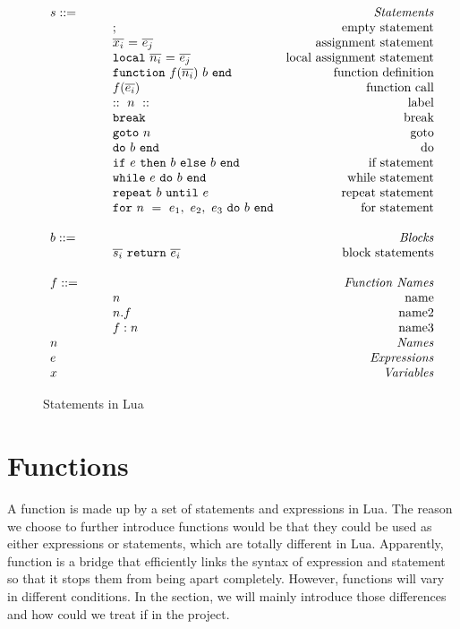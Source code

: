 \newcommand{\assign}[2]{{\overline{#1_i}}~{=}~{\overline{#2_j}}}
\newcommand{\doe}[1]{\mbox{\tt do}~#1~{\tt end}}
\newcommand{\ife}[3]{\mbox{\tt if}~{#1}~\mbox{\tt then}~{#2}~\mbox{\tt else}~{#3}~{\tt end}}
\newcommand{\whilee}[2]{\mbox{\tt while}~#1~{\tt do}~#2~{\tt end}}
\newcommand{\repeate}[2]{\mbox{\tt repeat}~#2~{\tt until}~#1~}
\newcommand{\for}[3]{\mbox{\tt for}~#1~=~#2_1,~#2_2,~#2_3~{\tt do}~#3~{\tt end}}
\newcommand{\function}[3]{\mbox{\tt function}~#1({\overline{#2_i}})~#3~{\tt end}}
\newcommand{\local}[2]{\mbox{\tt local}~{\assign #1 #2}}

\begin{figure}
\caption{Statements in Lua}
\label{fig:LuaStat}
\[
\begin{array}{llr}
  \mydefhead{s ::=\qquad\qquad\qquad\qquad}{Statements}
  \mydefcase{;}{empty statement}
  \mydefcase{\assign x e}{assignment statement}
  \mydefcase{\local n e}{local assignment statement}
  \mydefcase{\function f n b}{function definition}
  \mydefcase{f(\overline{e_i})}{function call}
  \mydefcase{::~n~::}{label}
  \mydefcase{\tt break}{break}
  \mydefcase{{\tt goto} ~n}{goto}
  \mydefcase{\doe b}{do}
  \mydefcase{\ife e b b}{if statement}
  \mydefcase{\whilee e b}{while statement}
  \mydefcase{\repeate e b}{repeat statement}
  \mydefcase{\for n e b}{for statement}
  \\
  \mydefhead{b ::=\qquad\qquad\qquad\qquad}{Blocks}
  \mydefcase{\overline{s_i}~{\tt return}~\overline{e_i}}{block statements}
  \\
  \mydefhead{f ::=\qquad\qquad\qquad\qquad}{Function Names}
  \mydefcase{n}{name}
  \mydefcase{n.f}{name2}
  \mydefcase{f:n}{name3}
  \mydefhead{n \qquad\qquad\qquad\qquad}{Names}
  \mydefhead{e \qquad\qquad\qquad\qquad}{Expressions}
  \mydefhead{x \qquad\qquad\qquad\qquad}{Variables}
\end{array}
\]
\end{figure}

\section{Functions}
A function is made up by a set of statements and expressions in Lua. The reason we choose to further introduce functions would be that they could be used as either expressions or statements, which are totally different in Lua. Apparently, function is a bridge that efficiently links the syntax of expression and statement so that it stops them from being apart completely. However, functions will vary in different conditions. In the section, we will mainly introduce those differences and how could we treat if in the project.

